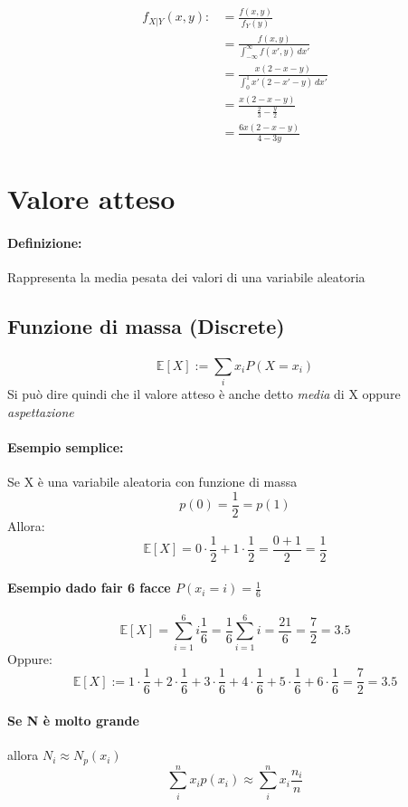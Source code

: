 \documentclass[]{article}
\newcommand{\ev}{\mathbb{E}[X]}
\renewcommand{\ev}[1]{\mathbb{E}[#1]}
\newcommand{\definizione}{\paragraph{Definizione:}}
\begin{document}
    \begin{equation*}
        \begin{split}
            f_{X|Y}(x,y):&= \frac{f(x,y)}{f_Y(y)} \\
            & = \frac{f(x, y)}{\int_{-\infty}^{\infty} f(x', y) \, dx'} \\
            & = \frac{x(2-x-y)}{\int_{0}^{1} x'(2-x'-y) \, dx'} \\
            & = \frac{x(2-x-y)}{\frac{2}{3} - \frac{y}{2}} \\
            & = \frac{6x(2-x-y)}{4-3y}
        \end{split}
    \end{equation*}


    \newpage
    \section{Valore atteso}
    \definizione Rappresenta la media pesata dei valori di una variabile aleatoria

    \subsection{Funzione di massa (Discrete)}
    \[ \ev{X} := \sum_{i}^{} x_i P(X = x_i) \]
    Si può dire quindi che il valore atteso è anche detto \textit{media} di X oppure \textit{aspettazione}

    \paragraph{Esempio semplice:} Se X è una variabile aleatoria con funzione di massa
    \[ p(0) = \frac{1}{2} = p(1) \]
    Allora:
    \[ \ev{X} = 0 \cdot \frac{1}{2} + 1 \cdot \frac{1}{2} = \frac{0+1}{2} = \frac{1}{2}\]

    \paragraph{Esempio dado fair 6 facce $P(x_i = i) = \frac{1}{6}$}
    \[ \ev{X} = \sum_{i=1}^{6} i \frac{1}{6} = \frac{1}{6} \sum_{i=1}^{6} i = \frac{21}{6} = \frac{7}{2} = 3.5 \]
    Oppure:
    \[ \ev{X} := 1 \cdot \frac{1}{6} + 2 \cdot \frac{1}{6} + 3 \cdot \frac{1}{6} + 4 \cdot \frac{1}{6} + 5 \cdot \frac{1}{6} + 6 \cdot \frac{1}{6} = \frac{7}{2} = 3.5 \]

    \paragraph{Se N è molto grande} allora \textbf{$N_i \approx N_p(x_i)$}
    \[ \sum_{i}^{n} x_i p(x_i) \approx \sum_{i}^{n} x_i \frac{n_i}{n}\]
    
\end{document}
